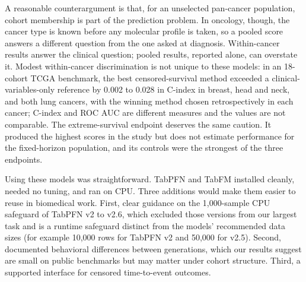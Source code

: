 \documentclass[pdflatex,sn-nature]{sn-jnl}
\begin{document}
A reasonable counterargument is that, for an unselected pan-cancer population, cohort membership is part of the prediction problem. In oncology, though, the cancer type is known before any molecular profile is taken, so a pooled score answers a different question from the one asked at diagnosis. Within-cancer results answer the clinical question; pooled results, reported alone, can overstate it. Modest within-cancer discrimination is not unique to these models: in an 18-cohort TCGA benchmark, the best censored-survival method exceeded a clinical-variables-only reference by 0.002 to 0.028 in C-index in breast, head and neck, and both lung cancers, with the winning method chosen retrospectively in each cancer; C-index and ROC AUC are different measures and the values are not comparable.\citep{herrmann2021benchmark} The extreme-survival endpoint deserves the same caution. It produced the highest scores in the study but does not estimate performance for the fixed-horizon population, and its controls were the strongest of the three endpoints.

Using these models was straightforward. TabPFN and TabFM installed cleanly, needed no tuning, and ran on CPU. Three additions would make them easier to reuse in biomedical work. First, clear guidance on the 1,000-sample CPU safeguard of TabPFN v2 to v2.6, which excluded those versions from our largest task and is a runtime safeguard distinct from the models' recommended data sizes (for example 10,000 rows for TabPFN v2 and 50,000 for v2.5).\citep{hollmann2025accurate,priorlabs2025tabpfn25} Second, documented behavioral differences between generations, which our results suggest are small on public benchmarks but may matter under cohort structure. Third, a supported interface for censored time-to-event outcomes.
\end{document}
